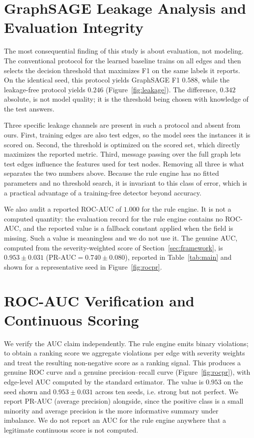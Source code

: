 \documentclass[journal]{IEEEtran}
\begin{document}
\section{GraphSAGE Leakage Analysis and Evaluation Integrity}
\label{sec:integrity}
The most consequential finding of this study is about evaluation, not modeling.
The conventional protocol for the learned baseline trains on all edges and then
selects the decision threshold that maximizes F1 on the same labels it reports.
On the identical seed, this protocol yields GraphSAGE F1 $0.588$, while the
leakage-free protocol yields $0.246$ (Figure~\ref{fig:leakage}). The difference,
$0.342$ absolute, is not model quality; it is the threshold being chosen with
knowledge of the test answers.

Three specific leakage channels are present in such a protocol and absent from
ours. First, training edges are also test edges, so the model sees the instances
it is scored on. Second, the threshold is optimized on the scored set, which
directly maximizes the reported metric. Third, message passing over the full
graph lets test edges influence the features used for test nodes. Removing all
three is what separates the two numbers above. Because the rule engine has no
fitted parameters and no threshold search, it is invariant to this class of
error, which is a practical advantage of a training-free detector beyond
accuracy.

We also audit a reported ROC-AUC of $1.000$ for the rule engine. It is not a
computed quantity: the evaluation record for the rule engine contains no ROC-AUC,
and the reported value is a fallback constant applied when the field is missing.
Such a value is meaningless and we do not use it. The genuine AUC, computed from
the severity-weighted score of Section~\ref{sec:framework}, is
$0.953\pm0.031$ ($\text{PR-AUC}=0.740\pm0.080$), reported in
Table~\ref{tab:main} and shown for a representative seed in
Figure~\ref{fig:rocpr}.

\section{ROC-AUC Verification and Continuous Scoring}
\label{sec:rocauaudit}
We verify the AUC claim independently. The rule engine emits binary violations;
to obtain a ranking score we aggregate violations per edge with severity weights
and treat the resulting non-negative score as a ranking signal. This produces a
genuine ROC curve and a genuine precision--recall curve
(Figure~\ref{fig:rocpr}), with edge-level AUC computed by the standard estimator.
The value is $0.953$ on the seed shown and $0.953\pm0.031$ across ten seeds, i.e.
strong but not perfect. We report PR-AUC (average precision) alongside, since the
positive class is a small minority and average precision is the more informative
summary under imbalance. We do not report an AUC for the rule engine anywhere
that a legitimate continuous score is not computed.
\end{document}
